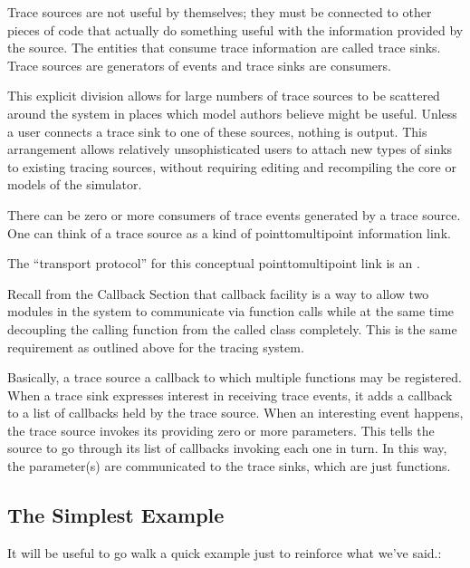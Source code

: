 \documentclass[letterpaper,10pt,english]{sphinxmanual}
\renewcommand{\sphinxcode}[1]{\texttt{\small{#1}}}
\begin{document}
Trace sources are not useful by themselves; they must be connected to other
pieces of code that actually do something useful with the information provided
by the source.  The entities that consume trace information are called trace
sinks. Trace sources are generators of events and trace sinks are consumers.

This explicit division allows for large numbers of trace sources to be scattered
around the system in places which model authors believe might be useful. Unless
a user connects a trace sink to one of these sources, nothing is output. This
arrangement allows relatively unsophisticated users to attach new types of sinks
to existing tracing sources, without requiring editing and recompiling the core
or models of the simulator.

There can be zero or more consumers of trace events generated by a trace source.
One can think of a trace source as a kind of point\sphinxhyphen{}to\sphinxhyphen{}multipoint information
link.

The “transport protocol” for this conceptual point\sphinxhyphen{}to\sphinxhyphen{}multipoint link is an
 \sphinxcode{}.

Recall from the Callback Section that callback facility is a way to allow two
modules in the system to communicate via function calls while at the same time
decoupling the calling function from the called class completely. This is the
same requirement as outlined above for the tracing system.

Basically, a trace source  a callback to which multiple functions may be
registered. When a trace sink expresses interest in receiving trace events, it
adds a callback to a list of callbacks held by the trace source. When an
interesting event happens, the trace source invokes its \sphinxcode{} providing
zero or more parameters. This tells the source to go through its list of
callbacks invoking each one in turn. In this way, the parameter(s) are
communicated to the trace sinks, which are just functions.


\subsection{The Simplest Example}
\label{\detokenize{tracing:the-simplest-example}}
It will be useful to go walk a quick example just to reinforce what we’ve
said.:
\end{document}
